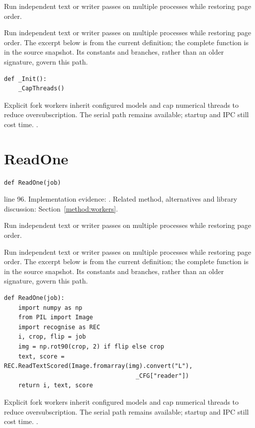 Run independent text or writer passes on multiple processes while restoring page order.


Run independent text or writer passes on multiple processes while restoring page order. The excerpt below is from the current definition; the complete function is in the source snapshot. Its constants and branches, rather than an older signature, govern this path.


\begin{lstlisting}[style=plain]
def _Init():
    _CapThreads()
\end{lstlisting}
Explicit fork workers inherit configured models and cap numerical threads to reduce oversubscription. The serial path remains available; startup and IPC still cost time. \cite{pythonmp,numpymatmul}.


\section{ReadOne}\label{fn:web-lineworkers:ReadOne}
\begin{lstlisting}[style=sig]
def ReadOne(job)
\end{lstlisting}
 line 96. Implementation evidence: \cite{code2026}. Related method, alternatives and library discussion: Section~\ref{method:workers}.


Run independent text or writer passes on multiple processes while restoring page order.


Run independent text or writer passes on multiple processes while restoring page order. The excerpt below is from the current definition; the complete function is in the source snapshot. Its constants and branches, rather than an older signature, govern this path.


\begin{lstlisting}[style=plain]
def ReadOne(job):
    import numpy as np
    from PIL import Image
    import recognise as REC
    i, crop, flip = job
    img = np.rot90(crop, 2) if flip else crop
    text, score = REC.ReadTextScored(Image.fromarray(img).convert("L"),
                                     _CFG["reader"])
    return i, text, score
\end{lstlisting}
Explicit fork workers inherit configured models and cap numerical threads to reduce oversubscription. The serial path remains available; startup and IPC still cost time. \cite{pythonmp,numpymatmul}.


